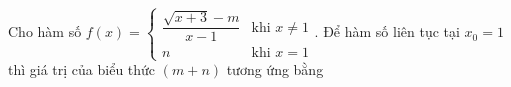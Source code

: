 \begin{ex}
Cho hàm số $f(x)=\begin{cases}\dfrac{\sqrt{x+3}-m}{x-1}&\text{khi }x\ne1\\n&\text{khi }x=1\end{cases}$. Để hàm số liên tục tại $x_0=1$ thì giá trị của biểu thức $(m+n)$ tương ứng bằng
\end{ex}
